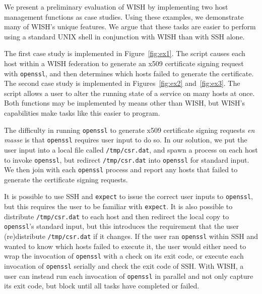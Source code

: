  \label{sec:eval}

We present a preliminary evaluation of  WISH by implementing two host
management functions as case studies. Using these examples, we demonstrate
many of WISH's unique features.  We argue that these tasks are easier to
perform using a standard UNIX shell in conjunction with WISH than with SSH
alone.

The first case study is implemented in Figure~\ref{fig:ex1}. The script causes
each host within a WISH federation to generate an x509 certificate signing
request with \texttt{openssl}, and then determines which hosts failed to
generate the certificate.  The second case study is implemented in
Figures~\ref{fig:ex2} and~\ref{fig:ex3}.  The script allows a user to alter the running state of
a service on many hosts at once.  Both functions may be implemented by means
other than WISH, but WISH's capabilities make tasks like this easier to
program.




The difficulty in running \texttt{openssl} to generate x509 certificate
signing requests \textit{en masse} is that \texttt{openssl} requires user
input to do so.  In our solution, we put the user input into a local file
called \texttt{/tmp/csr.dat}, and spawn a process on each host to invoke
\texttt{openssl}, but redirect \texttt{/tmp/csr.dat} into \texttt{openssl} for
standard input.  We then join with each \texttt{openssl} process and report
any hosts that failed to generate the certificate signing requests.

It is possible to use SSH and \texttt{expect} to issue the correct user inputs
to \texttt{openssl}, but this requires the user to be familiar with
\texttt{expect}.  It is also possible to distribute \texttt{/tmp/csr.dat} to
each host and then redirect the local copy to \texttt{openssl}'s standard
input, but this introduces the requirement that the user (re)distribute
\texttt{/tmp/csr.dat}  if it changes.  If the user ran \texttt{openssl} within
SSH and wanted to know which hosts failed to execute it, the user would either
need to wrap the invocation of \texttt{openssl} with a check on its exit code,
or execute each invocation of \texttt{openssl} serially and check the exit
code of SSH.  With WISH, a user can instead run each invocation of
\texttt{openssl} in parallel and not only capture its exit code, but block
until all tasks have completed or failed.

